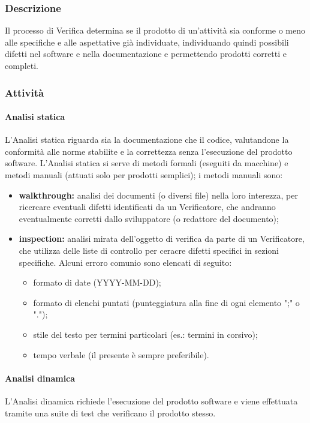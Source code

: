     \subsubsection{Descrizione}
      Il processo di Verifica determina se il prodotto di un'attività sia conforme o meno alle specifiche e alle aspettative già individuate, individuando quindi possibili difetti nel software e nella documentazione e permettendo prodotti corretti e completi.

    \subsubsection{Attività}
        \paragraph{Analisi statica}
          L'Analisi statica riguarda sia la documentazione che il codice, valutandone la conformità alle norme stabilite e la correttezza senza l'esecuzione del prodotto software. L'Analisi statica si serve di metodi formali (eseguiti da macchine) e metodi manuali (attuati solo per prodotti semplici); i metodi manuali sono:
          \begin{itemize}
            \item \textbf{walkthrough:} analisi dei documenti (o diversi file) nella loro interezza, per ricercare eventuali difetti identificati da un Verificatore, che andranno eventualmente corretti dallo sviluppatore (o redattore del documento);
            \item \textbf{inspection:} analisi mirata dell'oggetto di verifica da parte di un Verificatore, che utilizza delle liste di controllo per ceracre difetti specifici in sezioni specifiche. Alcuni erroro comunio sono elencati di seguito:
              \begin{itemize}
                \item formato di date (YYYY-MM-DD);
                \item formato di elenchi puntati (punteggiatura alla fine di ogni elemento ";" o ".");
                \item stile del testo per termini particolari (es.: termini in corsivo);
                \item tempo verbale (il presente è sempre preferibile).
              \end{itemize}
          \end{itemize}

        \paragraph{Analisi dinamica}
          L'Analisi dinamica richiede l'esecuzione del prodotto software e viene effettuata tramite una suite di test che verificano il prodotto stesso.

